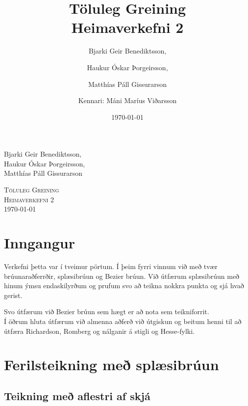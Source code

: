 \documentclass[a4]{article}
\title{Töluleg Greining\\ Heimaverkefni 2}
\date{\today{}}
\author{ 
  Bjarki Geir Benediktsson,\and
  Haukur Óskar Þorgeirsson,\and
  Matthías Páll Gissurarson \and
  Kennari: Máni Maríus Viðarsson
  }
\begin{document}
\begin{flushright}
  Bjarki Geir Benediktsson,\\
  Haukur Óskar Þorgeirsson,\\
  Matthías Páll Gissurarson\\
\end{flushright}

\begin{center}
 \textsc{ \LARGE Töluleg Greining\\
  Heimaverkefni 2\\
  \today{}
  }
  \end{center}
\vfill

\maketitle
\section*{Inngangur}
Verkefni þetta var í tveimur pörtum. Í þeim fyrri vinnum við með tvær brúunaraðferrðir, splæsibrúun og Bezier brúun. Við útfærum splæsibrúun með hinum ýmsu endaskilyrðum og prufum svo að teikna nokkra punkta og sjá hvað gerist.

Svo útfærum við Bezier brúun sem hægt er að nota sem teikniforrit.\\

Í öðrum hluta útfærum við almenna aðferð við útgiskun og beitum henni til að útfæra Richardson, Romberg og nálganir á stigli og Hesse-fylki.
\section{Ferilsteikning með splæsibrúun}
\subsection{Teikning með aflestri af skjá}

\end{document}
